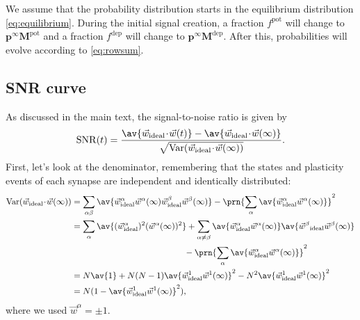 \documentclass[9pt,twocolumn,twoside,lineno]{pnas-new}
\newcommand{\cdt}{\!\cdot\!}
\DeclareMathOperator{\var}{Var}
\DeclareMathOperator{\snr}{SNR}
\newcommand{\wv}{\vec{w}}
\newcommand{\prob}{\mathbf{p}}
\newcommand{\eq}{\prob^\infty}
\newcommand{\M}{\mathbf{M}}
\newcommand{\pot}{^{\text{pot}}}
\newcommand{\dep}{^{\text{dep}}}
\begin{document}
\begin{strip}
We assume that the probability distribution starts in the equilibrium distribution \cref{eq:equilibrium}.
During the initial signal creation, a fraction $f\pot$ will change to $\eq\M\pot$ and a fraction $f\dep$ will change to $\eq\M\dep$.
After this, probabilities will evolve according to \cref{eq:rowsum}.

\subsection{SNR curve}\label{sec:SNRcurve}

As discussed in the main text, the signal-to-noise ratio is given by
%
\begin{equation}\label{eq:SNRdef:s}
  \snr(t) = \frac{\av{\wv_\text{ideal}\cdt\wv(t)} - \av{\wv_\text{ideal}\cdt\wv(\infty)}}
     {\sqrt{\var(\wv_\text{ideal}\cdt\wv(\infty))}}.
\end{equation}
%
First, let's look at the denominator, remembering that the states and plasticity events of each synapse are independent and identically distributed:
%
\begin{equation}\label{eq:noise}
\begin{aligned}
  \var(\wv_\text{ideal}\cdt\wv(\infty))
    &= \sum_{\alpha\beta} \av{\wv^\alpha_\text{ideal}\wv^\alpha(\infty) \wv^\beta_\text{ideal}\wv^\beta(\infty)}
    - \prn{\sum_\alpha \av{\wv^\alpha_\text{ideal}\wv^\alpha(\infty)}}^2 \\
    &= \sum_{\alpha} \av{(\wv^\alpha_\text{ideal})^2(\wv^\alpha(\infty))^2}
    + \sum_{\alpha\neq\beta} \av{\wv^\alpha_\text{ideal}\wv^\alpha(\infty)}\av{\smash{\wv^\beta}_\text{ideal}\smash{\wv^\beta}(\infty)}
    \\&\phantom{= \sum_{\alpha}  \av{(\wv^\alpha_\text{ideal})^2(\wv^\alpha(\infty))^2}}
    - \prn{\sum_\alpha \av{\wv^\alpha_\text{ideal}\wv^\alpha(\infty)}}^2  \\
    &= N\av{1}
    + N(N-1)\av{\wv^1_\text{ideal}\wv^1(\infty)}^2
    - N^2\av{\wv^1_\text{ideal}\wv^1(\infty)}^2 \\
    &= N(1-\av{\wv^1_\text{ideal}\wv^1(\infty)}^2),
\end{aligned}
\end{equation}
%
where we used $\wv^\alpha=\pm1$.


\end{strip}
\end{document}
